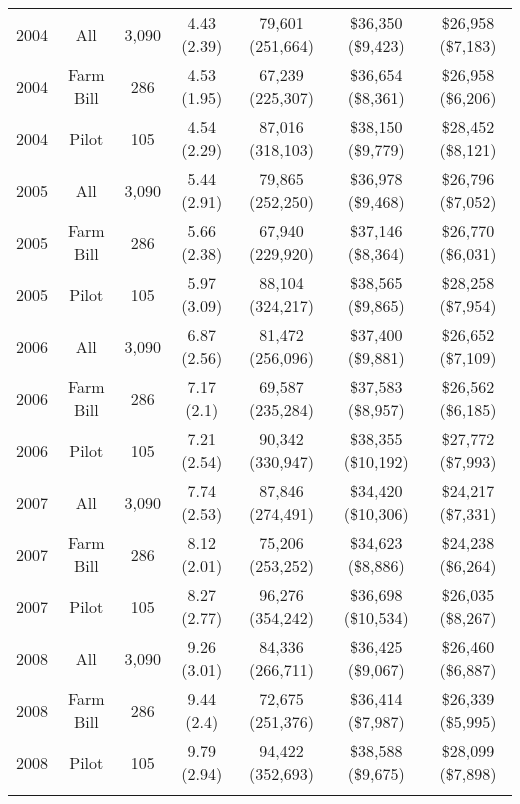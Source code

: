 \begin{table}[!htbp]
\begin{tabular}{@{\extracolsep{5pt}} ccccccc}
2004 & All & 3,090 & 4.43 (2.39) & 79,601 (251,664) & \$36,350 (\$9,423) & \$26,958 (\$7,183) \\ 
2004 & Farm Bill & 286 & 4.53 (1.95) & 67,239 (225,307) & \$36,654 (\$8,361) & \$26,958 (\$6,206) \\ 
2004 & Pilot & 105 & 4.54 (2.29) & 87,016 (318,103) & \$38,150 (\$9,779) & \$28,452 (\$8,121) \\ 
2005 & All & 3,090 & 5.44 (2.91) & 79,865 (252,250) & \$36,978 (\$9,468) & \$26,796 (\$7,052) \\ 
2005 & Farm Bill & 286 & 5.66 (2.38) & 67,940 (229,920) & \$37,146 (\$8,364) & \$26,770 (\$6,031) \\ 
2005 & Pilot & 105 & 5.97 (3.09) & 88,104 (324,217) & \$38,565 (\$9,865) & \$28,258 (\$7,954) \\ 
2006 & All & 3,090 & 6.87 (2.56) & 81,472 (256,096) & \$37,400 (\$9,881) & \$26,652 (\$7,109) \\ 
2006 & Farm Bill & 286 & 7.17 (2.1) & 69,587 (235,284) & \$37,583 (\$8,957) & \$26,562 (\$6,185) \\ 
2006 & Pilot & 105 & 7.21 (2.54) & 90,342 (330,947) & \$38,355 (\$10,192) & \$27,772 (\$7,993) \\ 
2007 & All & 3,090 & 7.74 (2.53) & 87,846 (274,491) & \$34,420 (\$10,306) & \$24,217 (\$7,331) \\ 
2007 & Farm Bill & 286 & 8.12 (2.01) & 75,206 (253,252) & \$34,623 (\$8,886) & \$24,238 (\$6,264) \\ 
2007 & Pilot & 105 & 8.27 (2.77) & 96,276 (354,242) & \$36,698 (\$10,534) & \$26,035 (\$8,267) \\ 
2008 & All & 3,090 & 9.26 (3.01) & 84,336 (266,711) & \$36,425 (\$9,067) & \$26,460 (\$6,887) \\ 
2008 & Farm Bill & 286 & 9.44 (2.4) & 72,675 (251,376) & \$36,414 (\$7,987) & \$26,339 (\$5,995) \\ 
2008 & Pilot & 105 & 9.79 (2.94) & 94,422 (352,693) & \$38,588 (\$9,675) & \$28,099 (\$7,898) \\ 
\hline \\[-1.8ex] 
\end{tabular} 
\end{table} 
